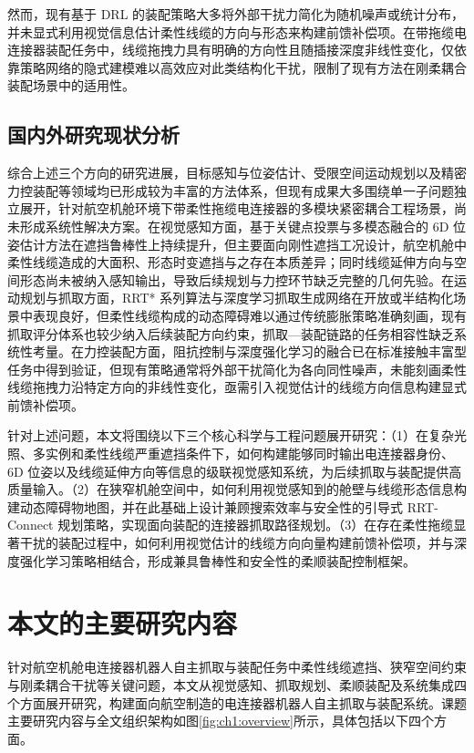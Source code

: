 然而，现有基于 DRL 的装配策略大多将外部干扰力简化为随机噪声或统计分布，并未显式利用视觉信息估计柔性线缆的方向与形态来构建前馈补偿项。在带拖缆电连接器装配任务中，线缆拖拽力具有明确的方向性且随插接深度非线性变化，仅依靠策略网络的隐式建模难以高效应对此类结构化干扰，限制了现有方法在刚柔耦合装配场景中的适用性。

\subsection{国内外研究现状分析}

综合上述三个方向的研究进展，目标感知与位姿估计、受限空间运动规划以及精密力控装配等领域均已形成较为丰富的方法体系，但现有成果大多围绕单一子问题独立展开，针对航空机舱环境下带柔性拖缆电连接器的多模块紧密耦合工程场景，尚未形成系统性解决方案。在视觉感知方面，基于关键点投票与多模态融合的 6D 位姿估计方法在遮挡鲁棒性上持续提升，但主要面向刚性遮挡工况设计，航空机舱中柔性线缆造成的大面积、形态时变遮挡与之存在本质差异；同时线缆延伸方向与空间形态尚未被纳入感知输出，导致后续规划与力控环节缺乏完整的几何先验。在运动规划与抓取方面，RRT* 系列算法与深度学习抓取生成网络在开放或半结构化场景中表现良好，但柔性线缆构成的动态障碍难以通过传统膨胀策略准确刻画，现有抓取评分体系也较少纳入后续装配方向约束，抓取—装配链路的任务相容性缺乏系统性考量。在力控装配方面，阻抗控制与深度强化学习的融合已在标准接触丰富型任务中得到验证，但现有策略通常将外部干扰简化为各向同性噪声，未能刻画柔性线缆拖拽力沿特定方向的非线性变化，亟需引入视觉估计的线缆方向信息构建显式前馈补偿项。

针对上述问题，本文将围绕以下三个核心科学与工程问题展开研究：（1）在复杂光照、多实例和柔性线缆严重遮挡条件下，如何构建能够同时输出电连接器身份、6D 位姿以及线缆延伸方向等信息的级联视觉感知系统，为后续抓取与装配提供高质量输入。（2）在狭窄机舱空间中，如何利用视觉感知到的舱壁与线缆形态信息构建动态障碍物地图，并在此基础上设计兼顾搜索效率与安全性的引导式 RRT-Connect 规划策略，实现面向装配的连接器抓取路径规划。（3）在存在柔性拖缆显著干扰的装配过程中，如何利用视觉估计的线缆方向向量构建前馈补偿项，并与深度强化学习策略相结合，形成兼具鲁棒性和安全性的柔顺装配控制框架。

\section{本文的主要研究内容}

针对航空机舱电连接器机器人自主抓取与装配任务中柔性线缆遮挡、狭窄空间约束与刚柔耦合干扰等关键问题，本文从视觉感知、抓取规划、柔顺装配及系统集成四个方面展开研究，构建面向航空制造的电连接器机器人自主抓取与装配系统。课题主要研究内容与全文组织架构如图\ref{fig:ch1:overview}所示，具体包括以下四个方面。

